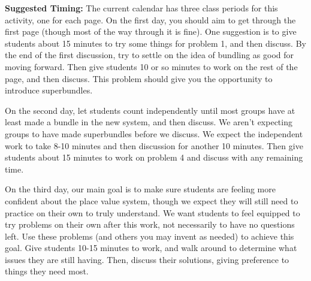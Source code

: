 \documentclass{ximera}
\begin{document}
\begin{instructorNotes}
{\bf Suggested Timing:} The current calendar has three class periods for this activity, one for each page. On the first day, you should aim to get through the first page (though most of the way through it is fine). One suggestion is to give students about 15 minutes to try some things for problem 1, and then discuss. By the end of the first discussion, try to settle on the idea of bundling as good for moving forward. Then give students 10 or so minutes to work on the rest of the page, and then discuss. This problem should give you the opportunity to introduce superbundles. 

On the second day, let students count independently until most groups have at least made a bundle in the new system, and then discuss. We aren't expecting groups to have made superbundles before we discuss. We expect the independent work to take 8-10 minutes and then discussion for another 10 minutes. Then give students about 15 minutes to work on problem 4 and discuss with any remaining time.

On the third day, our main goal is to make sure students are feeling more confident about the place value system, though we expect they will still need to practice on their own to truly understand. We want students to feel equipped to try problems on their own after this work, not necessarily to have no questions left. Use these problems (and others you may invent as needed) to achieve this goal. Give students 10-15 minutes to work, and walk around to determine what issues they are still having. Then, discuss their solutions, giving preference to things they need most. 


\end{instructorNotes}
\end{document}
